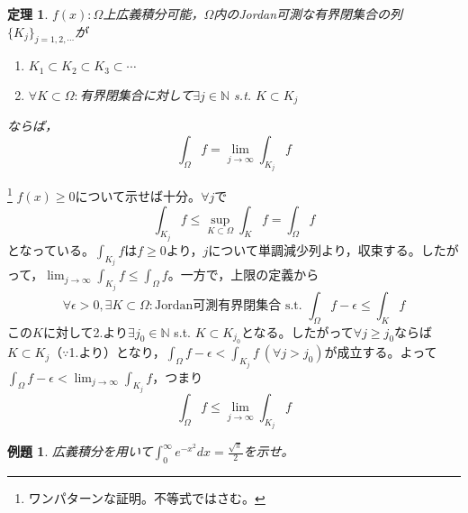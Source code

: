 \documentclass[dvipdfmx,a4j,10pt]{jsarticle}
\makeatletter
\theoremstyle{mystyle1}
\newtheorem{thm}[dfn]{定理}
\theoremstyle{mystyle2}
\newtheorem{ex}{例題}
\renewenvironment{proof}[1][\proofname]{\par
  \pushQED{\qed}%
  \normalfont
  \topsep6\p@\@plus6\p@ \trivlist
  \item[\hskip\labelsep{\bfseries\sffamily #1}]\ignorespaces
}{%
  \popQED\endtrivlist\@endpefalse
}
\renewcommand\proofname{証明}
\makeatother
\begin{document}


\begin{framed}
	\begin{thm}
		$f(x):\Omega$上広義積分可能，$\Omega$内のJordan可測な有界閉集合の列$\{K_j\}_{j=1,2,\cdots}$が
		\begin{enumerate}
			\item $K_1\subset K_2\subset K_3\subset \cdots$
			\item $\forall K\subset\Omega:$有界閉集合に対して$\exists j\in \mathbb{N}$ s.t. $K\subset K_j$
		\end{enumerate}
		ならば，
		\[
			\int_\Omega f = \lim_{j\to\infty}\int_{K_j} f
		\]
	\end{thm}
\end{framed}

\begin{proof}\footnote{ワンパターンな証明。不等式ではさむ。}
	$f(x)\geq 0$について示せば十分。$\forall j$で
	\[
		\int_{K_j} f\leq \sup_{K\subset\Omega}\int_K f = \int_\Omega f
	\]
	となっている。$\displaystyle\int_{K_j} f$は$f\geq 0$より，$j$について単調減少列より，収束する。したがって，$\displaystyle\lim_{j\to\infty}\int_{K_j}f\leq\int_{\Omega} f$。一方で，上限の定義から
	\[
		\forall\epsilon>0,\exists K\subset\Omega:\textrm{Jordan可測有界閉集合\ s.t.\ }\int_\Omega f-\epsilon \leq \int_K f
	\]
	この$K$に対して2.より$\exists j_0\in\mathbb{N}$ s.t. $K\subset K_{j_0}$となる。したがって$\forall j\geq j_0$ならば$K\subset K_j$（$\because$1.より）となり，$\displaystyle\int_\Omega f-\epsilon < \int_{K_j} f\ (\forall j> j_0)$が成立する。よって$\displaystyle\int_\Omega f-\epsilon < \lim_{j\to\infty}\int_{K_j}f$，つまり
	\[
	\int_\Omega f\leq \lim_{j\to\infty}\int_{K_j}f
	\]
\end{proof}

\begin{ex}
広義積分を用いて$\displaystyle\int_0^\infty e^{-x^2}dx=\frac{\sqrt{\pi}}{2}$を示せ。
\end{ex}
\end{document}
